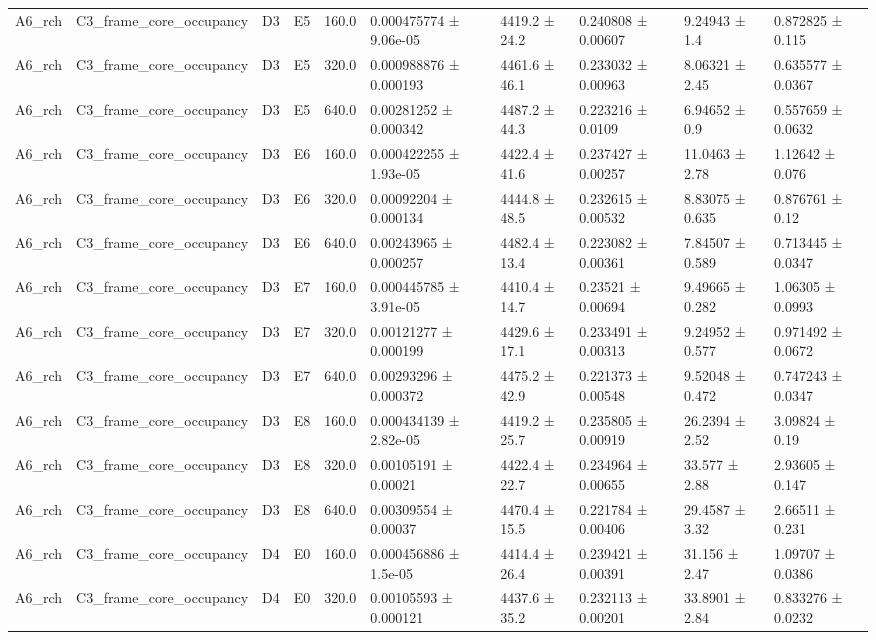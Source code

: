 \begin{table}
\begin{tabular}{llllllllll}
A6\_rch & C3\_frame\_core\_occupancy & D3 & E5 & 160.0 & 0.000475774 ± 9.06e-05 & 4419.2 ± 24.2 & 0.240808 ± 0.00607 & 9.24943 ± 1.4 & 0.872825 ± 0.115 \\
A6\_rch & C3\_frame\_core\_occupancy & D3 & E5 & 320.0 & 0.000988876 ± 0.000193 & 4461.6 ± 46.1 & 0.233032 ± 0.00963 & 8.06321 ± 2.45 & 0.635577 ± 0.0367 \\
A6\_rch & C3\_frame\_core\_occupancy & D3 & E5 & 640.0 & 0.00281252 ± 0.000342 & 4487.2 ± 44.3 & 0.223216 ± 0.0109 & 6.94652 ± 0.9 & 0.557659 ± 0.0632 \\
A6\_rch & C3\_frame\_core\_occupancy & D3 & E6 & 160.0 & 0.000422255 ± 1.93e-05 & 4422.4 ± 41.6 & 0.237427 ± 0.00257 & 11.0463 ± 2.78 & 1.12642 ± 0.076 \\
A6\_rch & C3\_frame\_core\_occupancy & D3 & E6 & 320.0 & 0.00092204 ± 0.000134 & 4444.8 ± 48.5 & 0.232615 ± 0.00532 & 8.83075 ± 0.635 & 0.876761 ± 0.12 \\
A6\_rch & C3\_frame\_core\_occupancy & D3 & E6 & 640.0 & 0.00243965 ± 0.000257 & 4482.4 ± 13.4 & 0.223082 ± 0.00361 & 7.84507 ± 0.589 & 0.713445 ± 0.0347 \\
A6\_rch & C3\_frame\_core\_occupancy & D3 & E7 & 160.0 & 0.000445785 ± 3.91e-05 & 4410.4 ± 14.7 & 0.23521 ± 0.00694 & 9.49665 ± 0.282 & 1.06305 ± 0.0993 \\
A6\_rch & C3\_frame\_core\_occupancy & D3 & E7 & 320.0 & 0.00121277 ± 0.000199 & 4429.6 ± 17.1 & 0.233491 ± 0.00313 & 9.24952 ± 0.577 & 0.971492 ± 0.0672 \\
A6\_rch & C3\_frame\_core\_occupancy & D3 & E7 & 640.0 & 0.00293296 ± 0.000372 & 4475.2 ± 42.9 & 0.221373 ± 0.00548 & 9.52048 ± 0.472 & 0.747243 ± 0.0347 \\
A6\_rch & C3\_frame\_core\_occupancy & D3 & E8 & 160.0 & 0.000434139 ± 2.82e-05 & 4419.2 ± 25.7 & 0.235805 ± 0.00919 & 26.2394 ± 2.52 & 3.09824 ± 0.19 \\
A6\_rch & C3\_frame\_core\_occupancy & D3 & E8 & 320.0 & 0.00105191 ± 0.00021 & 4422.4 ± 22.7 & 0.234964 ± 0.00655 & 33.577 ± 2.88 & 2.93605 ± 0.147 \\
A6\_rch & C3\_frame\_core\_occupancy & D3 & E8 & 640.0 & 0.00309554 ± 0.00037 & 4470.4 ± 15.5 & 0.221784 ± 0.00406 & 29.4587 ± 3.32 & 2.66511 ± 0.231 \\
A6\_rch & C3\_frame\_core\_occupancy & D4 & E0 & 160.0 & 0.000456886 ± 1.5e-05 & 4414.4 ± 26.4 & 0.239421 ± 0.00391 & 31.156 ± 2.47 & 1.09707 ± 0.0386 \\
A6\_rch & C3\_frame\_core\_occupancy & D4 & E0 & 320.0 & 0.00105593 ± 0.000121 & 4437.6 ± 35.2 & 0.232113 ± 0.00201 & 33.8901 ± 2.84 & 0.833276 ± 0.0232 \\

\end{tabular}
\end{table}
